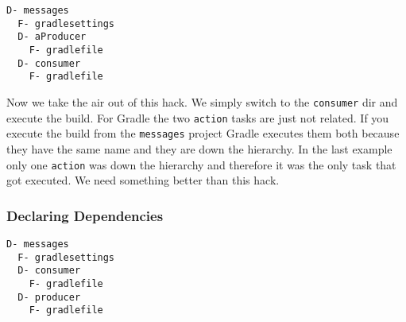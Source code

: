 \begin{minipage}[t]{7cm}
\begin{Verbatim}[frame=single,label=Project Tree]
D- messages
  F- gradlesettings
  D- aProducer
    F- gradlefile
  D- consumer
    F- gradlefile	
\end{Verbatim}
\end{minipage}	
\begin{minipage}[t]{9cm}
\end{minipage}

Now we take the air out of this hack. We simply switch to the \texttt{consumer} dir and execute the build.
For Gradle the two \texttt{action} tasks are just not related. If you execute the build from the \texttt{messages} project Gradle executes them both because they have the same name and they are down the hierarchy. In the last example only one \texttt{action} was down the hierarchy and therefore it was the only task that got executed. We need something better than this hack.
\subsubsection{Declaring Dependencies} %
\label{ssub:declaring_dependencies}

\begin{minipage}[t]{7cm}
\begin{Verbatim}[frame=single,label=Project Tree]
D- messages
  F- gradlesettings
  D- consumer
    F- gradlefile
  D- producer
    F- gradlefile	
\end{Verbatim}
\end{minipage}	
\begin{minipage}[t]{9cm}
\end{minipage}

